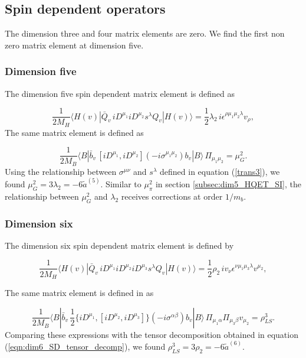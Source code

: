 \subsection{Spin dependent operators}
The dimension three and four matrix elements are zero. We find the first non zero matrix element at dimension five.
\vspace{-0.4cm}
\subsubsection{Dimension five}
\vspace{-0.3cm}
The dimension five spin dependent matrix element is defined as \cite{Mannel:1994kv}

\begin{equation}
\dfrac1{2M_H}\langle H(v)|\bar Q_v\, iD^{\mu_1}iD^{\mu_2}s^\lambda Q_v|H(v)\rangle=\dfrac12\lambda_2\,i\epsilon^{\rho\mu_1\mu_2\lambda}v_\rho,
\end{equation}
The same matrix element is defined as \cite{Mannel:2010wj}

\begin{equation}
\dfrac1{2M_B}\langle B|\bar b_v\, [iD^{\mu_1},iD^{\mu_2}](-i\sigma^{\mu_1\mu_2})b_v|B\rangle\,\Pi_{\mu_1\mu_2}=\mu_G^2.
\end{equation}
Using the relationship between $\sigma^{\mu\nu}$ and $s^{\lambda}$ defined in equation (\ref{trans3}), we found $\mu_G^2=3\lambda_2=-6\tilde{a}^{(5)}$. Similar to $\mu_{\pi}^2$ in section \ref{subsec:dim5_HQET_SI}, the relationship between $\mu_G^2$ and $\lambda_2$ receives corrections at order $1/m_b$.
\subsubsection{Dimension six}
\vspace{-0.3cm}
The dimension six spin dependent matrix element is defined by \cite{Mannel:1994kv}

\begin{equation}
\dfrac1{2M_H}\langle H(v)|\bar Q_v\, iD^{\mu_1}iD^{\mu_2}iD^{\mu_3}s^\lambda Q_v|H(v)\rangle=\dfrac12\rho_2\,iv_\nu\epsilon^{\nu\mu_1\mu_3\lambda}v^{\mu_2},
\end{equation}

The same matrix element is defined in \cite{Mannel:2010wj} as

\begin{equation}
\dfrac1{2M_B}\langle B|\bar b_v\,\frac12\big\{iD^{\mu_1},\left [iD^{\mu_2},iD^{\mu_3}\right]\big\}(-i\sigma^{\alpha\beta})b_v|B\rangle\,\Pi_{\mu_1\alpha}\Pi_{\mu_3\beta}v_{\mu_2}=\rho_{LS}^3.
\end{equation}
Comparing these expressions with the tensor decomposition obtained in equation (\ref{eqn:dim6_SD_tensor_decomp}), we found $\rho_{LS}^3=3\rho_2=-6\tilde{a}^{(6)}$.
\vspace{-0.3cm}
